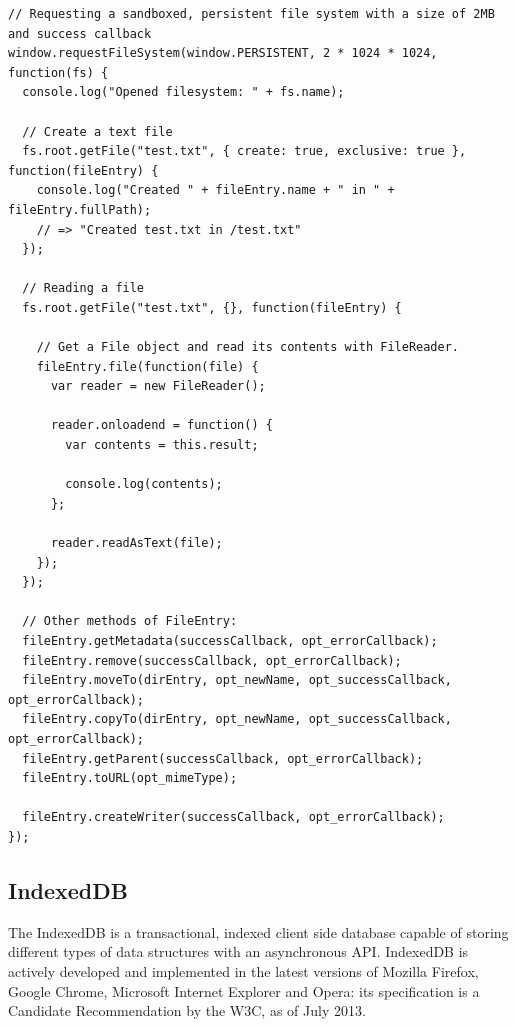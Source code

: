 \begin{Code}
\begin{lstlisting}[caption={Use of FileSystem}, label={lst:filesystem}]
// Requesting a sandboxed, persistent file system with a size of 2MB and success callback
window.requestFileSystem(window.PERSISTENT, 2 * 1024 * 1024, function(fs) {
  console.log("Opened filesystem: " + fs.name);

  // Create a text file
  fs.root.getFile("test.txt", { create: true, exclusive: true }, function(fileEntry) {
    console.log("Created " + fileEntry.name + " in " + fileEntry.fullPath);
    // => "Created test.txt in /test.txt"
  });

  // Reading a file
  fs.root.getFile("test.txt", {}, function(fileEntry) {

    // Get a File object and read its contents with FileReader.
    fileEntry.file(function(file) {
      var reader = new FileReader();

      reader.onloadend = function() {
        var contents = this.result;

        console.log(contents);
      };

      reader.readAsText(file);
    });
  });

  // Other methods of FileEntry:
  fileEntry.getMetadata(successCallback, opt_errorCallback);
  fileEntry.remove(successCallback, opt_errorCallback);
  fileEntry.moveTo(dirEntry, opt_newName, opt_successCallback, opt_errorCallback);
  fileEntry.copyTo(dirEntry, opt_newName, opt_successCallback, opt_errorCallback);
  fileEntry.getParent(successCallback, opt_errorCallback);
  fileEntry.toURL(opt_mimeType);

  fileEntry.createWriter(successCallback, opt_errorCallback);
});
\end{lstlisting}
\end{Code}

\subsection{IndexedDB}
\label{sec:indexeddb}
The IndexedDB is a transactional, indexed client side database capable of storing different types of data structures with an asynchronous API. IndexedDB is actively developed and implemented in the latest versions of Mozilla Firefox, Google Chrome, Microsoft Internet Explorer and Opera: its specification is a Candidate Recommendation by the W3C, as of July 2013\cite{IndexedDB:Online}.

